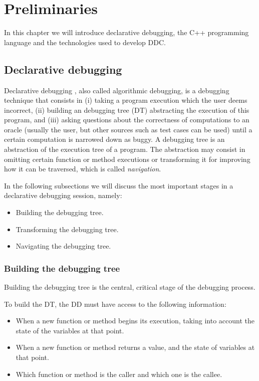\chapter{Preliminaries}
\label{cap:preliminaries}

In this chapter we will introduce declarative debugging, the C++ programming language and the technologies used to develop DDC.

\section{Declarative debugging}
Declarative debugging \cite{shapiro1982algorithmic}, also called algorithmic debugging, is a debugging technique that consists in (i) taking a program execution which the user deems incorrect, (ii) building an debugging tree (DT) abstracting the execution of this program, and (iii) asking questions about the correctness of computations to an oracle (usually the user, but other sources such as test cases can be used) until a certain computation is narrowed down as buggy.
A debugging tree is an abstraction of the execution tree of a program. The abstraction may consist in omitting certain function or method executions or transforming it for improving how it can be traversed, which is called \emph{navigation}. 

In the following subsections we will discuss the most important stages in a declarative debugging session, namely:
\begin{itemize}
    \item Building the debugging tree.
    \item Transforming the debugging tree.
    \item Navigating the debugging tree.
\end{itemize}

\subsection{Building the debugging tree}

Building the debugging tree is the central, critical stage of the debugging process.

To build the DT, the DD must have access to the following information:
\begin{itemize}
    \item When a new function or method begins its execution, taking into account the state of the variables at that point.
    \item When a new function or method returns a value, and the state of variables at that point.
    \item Which function or method is the caller and which one is the callee.
\end{itemize}

